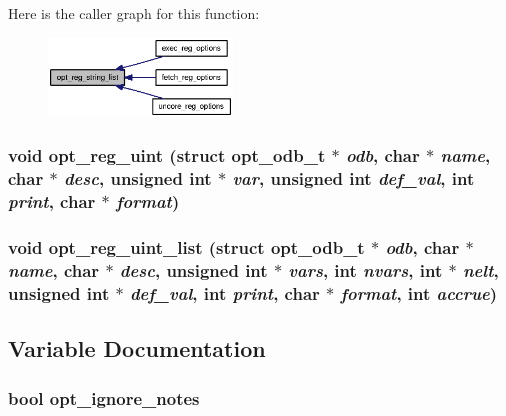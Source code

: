 Here is the caller graph for this function:\nopagebreak
\begin{figure}[H]
\begin{center}
\leavevmode
\includegraphics[width=139pt]{options_8h_752ea4c2b38f9ed0bb1126b7b23ac869_icgraph}
\end{center}
\end{figure}
\subsubsection[{opt\_\-reg\_\-uint}]{\setlength{\rightskip}{0pt plus 5cm}void opt\_\-reg\_\-uint (struct {\bf opt\_\-odb\_\-t} $\ast$ {\em odb}, \/  char $\ast$ {\em name}, \/  char $\ast$ {\em desc}, \/  unsigned int $\ast$ {\em var}, \/  unsigned int {\em def\_\-val}, \/  int {\em print}, \/  char $\ast$ {\em format})}\label{options_8h_9507998320eb91ad361735d2120eb4fd}


\subsubsection[{opt\_\-reg\_\-uint\_\-list}]{\setlength{\rightskip}{0pt plus 5cm}void opt\_\-reg\_\-uint\_\-list (struct {\bf opt\_\-odb\_\-t} $\ast$ {\em odb}, \/  char $\ast$ {\em name}, \/  char $\ast$ {\em desc}, \/  unsigned int $\ast$ {\em vars}, \/  int {\em nvars}, \/  int $\ast$ {\em nelt}, \/  unsigned int $\ast$ {\em def\_\-val}, \/  int {\em print}, \/  char $\ast$ {\em format}, \/  int {\em accrue})}\label{options_8h_8ba54cb3d259cbe1c0faa57a55d510c7}




\subsection{Variable Documentation}
\subsubsection[{opt\_\-ignore\_\-notes}]{\setlength{\rightskip}{0pt plus 5cm}bool {\bf opt\_\-ignore\_\-notes}}\label{options_8h_c2771665f9c910976267026901cb2355}


